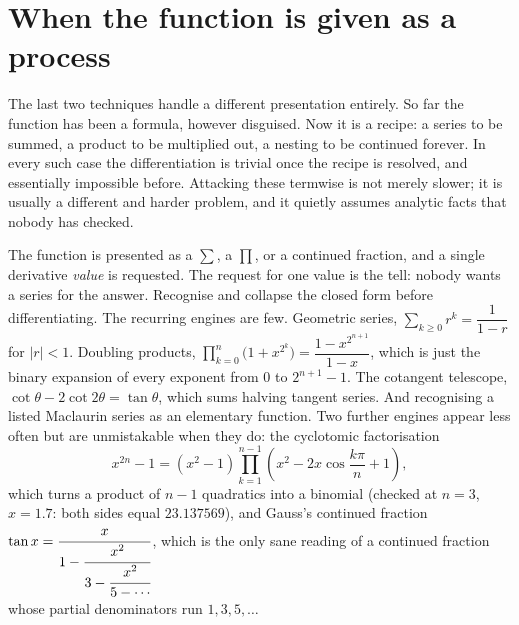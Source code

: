 \section{When the function is given as a process}

The last two techniques handle a different presentation entirely. So far the function has been a formula, however disguised. Now it is a recipe: a series to be summed, a product to be multiplied out, a nesting to be continued forever. In every such case the differentiation is trivial once the recipe is resolved, and essentially impossible before. Attacking these termwise is not merely slower; it is usually a different and harder problem, and it quietly assumes analytic facts that nobody has checked.

\cue The function is presented as a $\sum$, a $\prod$, or a continued fraction, and a single derivative \emph{value} is requested. The request for one value is the tell: nobody wants a series for the answer.
\method Recognise and collapse the closed form before differentiating. The recurring engines are few. Geometric series, $\sum_{k\geq0}r^{k}=\dfrac{1}{1-r}$ for $\lvert r\rvert<1$. Doubling products, $\prod_{k=0}^{n}\bigl(1+x^{2^{k}}\bigr)=\dfrac{1-x^{2^{n+1}}}{1-x}$, which is just the binary expansion of every exponent from $0$ to $2^{n+1}-1$. The cotangent telescope, $\cot\theta-2\cot 2\theta=\tan\theta$, which sums halving tangent series. And recognising a listed Maclaurin series as an elementary function. Two further engines appear less often but are unmistakable when they do: the cyclotomic factorisation
\[
x^{2n}-1=(x^{2}-1)\prod_{k=1}^{n-1}\left(x^{2}-2x\cos\frac{k\pi}{n}+1\right),
\]
which turns a product of $n-1$ quadratics into a binomial (checked at $n=3$, $x=1.7$: both sides equal $23.137569$), and Gauss's continued fraction $\tan x=\cfrac{x}{1-\cfrac{x^{2}}{3-\cfrac{x^{2}}{5-\cdots}}}$, which is the only sane reading of a continued fraction whose partial denominators run $1,3,5,\ldots$

